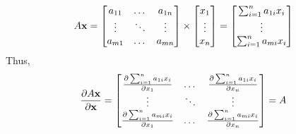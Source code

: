 \begin{align*}
	A{\mathbf{x}} = \begin{bmatrix}
		a_{11} & \dots & a_{1n}\\
		\vdots & \ddots & \vdots\\
		a_{m1} & \dots & a_{mn}\\
	\end{bmatrix}\times
	\begin{bmatrix}
		x_1\\
		\vdots\\
		x_n
		\end{bmatrix} = \begin{bmatrix}
		\sum_{i=1}^n a_{1i}x_i\\
		\vdots\\
		\sum_{i=1}^n a_{mi}x_i\\
	\end{bmatrix}
\end{align*}
Thus, 
\begin{align*}
	\frac{\partial A{\mathbf{x}}}{\partial {\mathbf{x}}} =\begin{bmatrix}
		\frac{\partial \sum_{i=1}^n a_{1i}x_i}{\partial x_1}& \dots & \frac{\partial \sum_{i=1}^n a_{1i}x_i}{\partial x_n}\\
		\vdots & \ddots & \vdots\\
		\frac{\partial \sum_{i=1}^n a_{mi}x_i}{\partial x_1} & \dots & \frac{\partial \sum_{i=1}^n a_{mi}x_i}{\partial x_n}
	\end{bmatrix} = A
\end{align*}
